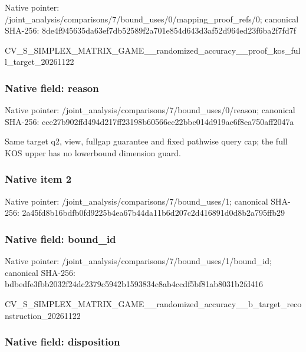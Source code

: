 \documentclass[10pt,a4paper]{article}
\begin{document}
Native pointer: /joint\_analysis/comparis\allowbreak{}ons/7/bound\_uses/0/mappi\allowbreak{}ng\_proof\_refs/0; canonical SHA-256: 8de4f945635da63ef7db5258\allowbreak{}9f2a701e854d643d3af52d96\allowbreak{}4ed23f6ba2f7fd7f


CV\_S\_SIMPLEX\_MATRIX\_GAME\allowbreak{}\_\_randomized\_accuracy\_\_p\allowbreak{}roof\_kos\_full\_target\_202\allowbreak{}61122


\subsubsection{Native field: reason}


Native pointer: /joint\_analysis/comparis\allowbreak{}ons/7/bound\_uses/0/reaso\allowbreak{}n; canonical SHA-256: cce27b902ffd494d217ff231\allowbreak{}98b60566ec22bbe014d919ac\allowbreak{}6f8ea750aff2047a


Same target q2, view, fullgap guarantee and fixed pathwise query cap; the full KOS upper has no lowerbound dimension guard.


\subsubsection{Native item 2}


Native pointer: /joint\_analysis/comparis\allowbreak{}ons/7/bound\_uses/1; canonical SHA-256: 2a45fd8b16bdfb0fd9225b4e\allowbreak{}a67b44da11b6d207c2d41689\allowbreak{}1d0d8b2a795ffb29



\subsubsection{Native field: bound\_id}


Native pointer: /joint\_analysis/comparis\allowbreak{}ons/7/bound\_uses/1/bound\allowbreak{}\_id; canonical SHA-256: bdbedfe3fbb2032f24dc2379\allowbreak{}c5942b1593834c8ab4ccdf5b\allowbreak{}f81ab8031b2fd416


CV\_S\_SIMPLEX\_MATRIX\_GAME\allowbreak{}\_\_randomized\_accuracy\_\_b\allowbreak{}\_target\_reconstruction\_2\allowbreak{}0261122


\subsubsection{Native field: disposition}
\end{document}
